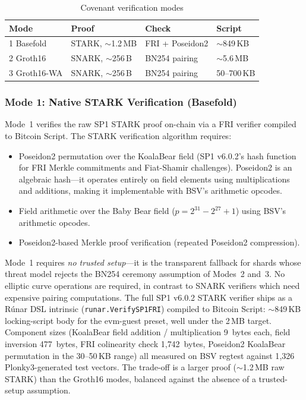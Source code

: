 \documentclass[11pt,twocolumn]{article}
\begin{document}
\begin{table}[h]
\centering  
\caption{Covenant verification modes}
\label{tab:modes}
\small
\begin{tabular}{@{}llll@{}}
\toprule
\textbf{Mode} & \textbf{Proof} & \textbf{Check} & \textbf{Script} \\
\midrule
1 Basefold  & STARK, $\sim$1.2\,MB & FRI + Poseidon2 & $\sim$849\,KB \\
2 Groth16   & SNARK, $\sim$256\,B  & BN254 pairing   & $\sim$5.6\,MB \\
3 Groth16-WA & SNARK, $\sim$256\,B & BN254 pairing   & 50--700\,KB \\
\bottomrule
\end{tabular}
\end{table}

\subsubsection{Mode 1: Native STARK Verification (Basefold)}
\label{sec:mode-basefold}

Mode~1 verifies the raw SP1 STARK proof on-chain via a FRI verifier compiled to Bitcoin Script. The STARK verification algorithm requires:

\begin{itemize}[nosep,leftmargin=1.5em]
\item Poseidon2 permutation over the KoalaBear field (SP1 v6.0.2's hash function for FRI Merkle commitments and Fiat-Shamir challenges). Poseidon2 is an algebraic hash---it operates entirely on field elements using multiplications and additions, making it implementable with BSV's arithmetic opcodes.
\item Field arithmetic over the Baby Bear field ($p = 2^{31} - 2^{27} + 1$) using BSV's arithmetic opcodes.
\item Poseidon2-based Merkle proof verification (repeated Poseidon2 compression).
\end{itemize}

\noindent Mode~1 requires \emph{no trusted setup}---it is the transparent fallback for shards whose threat model rejects the BN254 ceremony assumption of Modes~2 and~3. No elliptic curve operations are required, in contrast to SNARK verifiers which need expensive pairing computations. The full SP1 v6.0.2 STARK verifier ships as a R\'{u}nar DSL intrinsic (\texttt{runar.VerifySP1FRI}) compiled to Bitcoin Script: $\sim$849\,KB locking-script body for the evm-guest preset, well under the 2\,MB target. Component sizes (KoalaBear field addition / multiplication 9~bytes each, field inversion 477~bytes, FRI colinearity check 1{,}742~bytes, Poseidon2 KoalaBear permutation in the 30--50\,KB range) all measured on BSV regtest against 1{,}326 Plonky3-generated test vectors. The trade-off is a larger proof ($\sim$1.2\,MB raw STARK) than the Groth16 modes, balanced against the absence of a trusted-setup assumption.
\end{document}
